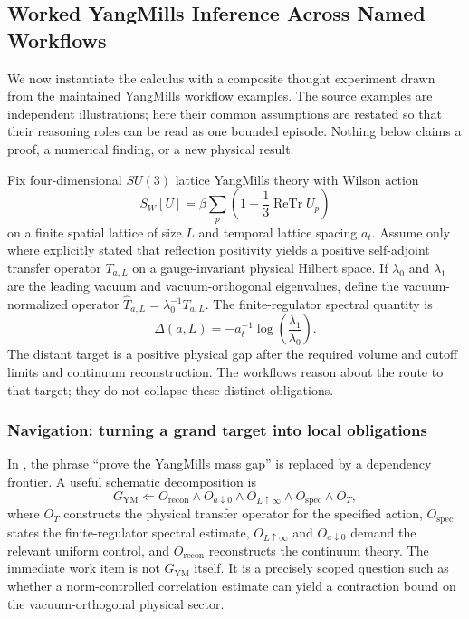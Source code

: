 \subsection{Worked Yang\textendash{}Mills Inference Across Named Workflows}

We now instantiate the calculus with a composite thought experiment drawn from
the maintained Yang\textendash{}Mills workflow examples. The source examples are
independent illustrations; here their common assumptions are restated so that
their reasoning roles can be read as one bounded episode. Nothing below claims
a proof, a numerical finding, or a new physical result.

Fix four-dimensional $SU(3)$ lattice Yang\textendash{}Mills theory with Wilson action
\[
  S_W[U]
  =\beta\sum_p\left(1-\frac{1}{3}\operatorname{ReTr}U_p\right)
\]
on a finite spatial lattice of size $L$ and temporal lattice spacing $a_t$.
Assume only where explicitly stated that reflection positivity yields a
positive self-adjoint transfer operator $T_{a,L}$ on a gauge-invariant physical
Hilbert space. If $\lambda_0$ and $\lambda_1$ are the leading vacuum and
vacuum-orthogonal eigenvalues, define the vacuum-normalized operator
$\widehat{T}_{a,L}=\lambda_0^{-1}T_{a,L}$. The finite-regulator spectral
quantity is
\[
  \Delta(a,L)
  =-a_t^{-1}\log\!\left(\frac{\lambda_1}{\lambda_0}\right).
\]
The distant target is a positive physical gap after the required volume and
cutoff limits and continuum reconstruction. The workflows reason about the
route to that target; they do not collapse these distinct obligations.

\subsubsection{Navigation: turning a grand target into local obligations}

In , the phrase ``prove the Yang\textendash{}Mills mass
gap'' is replaced by a dependency frontier. A useful schematic decomposition
is
\[
  G_{\mathrm{YM}}
  \Longleftarrow
  O_{\mathrm{recon}}\wedge O_{a\downarrow0}
  \wedge O_{L\uparrow\infty}\wedge O_{\mathrm{spec}}
  \wedge O_{T},
\]
where $O_T$ constructs the physical transfer operator for the specified
action, $O_{\mathrm{spec}}$ states the finite-regulator spectral estimate,
$O_{L\uparrow\infty}$ and $O_{a\downarrow0}$ demand the relevant uniform
control, and $O_{\mathrm{recon}}$ reconstructs the continuum theory. The
immediate work item is not $G_{\mathrm{YM}}$ itself. It is a precisely scoped
question such as whether a norm-controlled correlation estimate can yield a
contraction bound on the vacuum-orthogonal physical sector.

